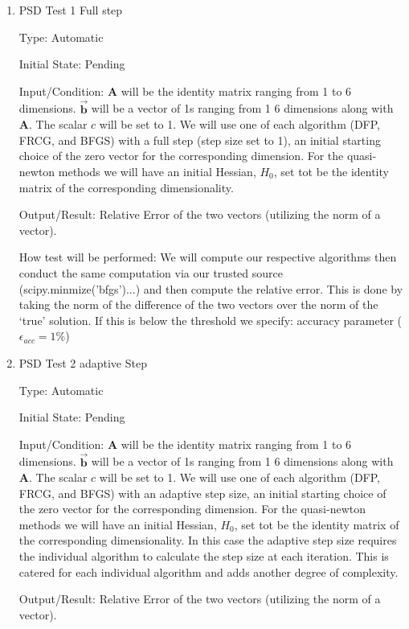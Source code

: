\documentclass[12pt, titlepage]{article}
\begin{document}
\begin{enumerate}

\item{PSD Test 1 Full step}\

Type: Automatic
					
Initial State: Pending
					
Input/Condition: $\mathbf{A}$ will be the identity matrix ranging from
1 to 6 dimensions. $\mathbf{\vec{b}}$ will be a vector of 1s ranging from 1 
6 dimensions along with $\mathbf{A}$. The scalar $c$ will be set to 1. We will
use one of each algorithm (DFP, FRCG, and BFGS) with a full step (step size set to 1),
an initial starting choice of the zero vector for the corresponding dimension. For the 
quasi-newton methods we will have an initial Hessian, $H_{0}$, set tot be the identity 
matrix of the corresponding dimensionality. 
					
Output/Result: Relative Error of the two vectors (utilizing the norm of a vector). 
					
How test will be performed: We will compute our respective algorithms then conduct the same 
computation via our trusted source (scipy.minmize('bfgs')...) and then compute the relative 
error. This is done by taking the norm of the difference of the two vectors over the norm of
the `true' solution. If this is below the threshold we specify: accuracy parameter ($\epsilon_{acc} = 1\%$) 


\item{PSD Test 2 adaptive Step}\

Type: Automatic
					
Initial State: Pending
					
Input/Condition: $\mathbf{A}$ will be the identity matrix ranging from
1 to 6 dimensions. $\mathbf{\vec{b}}$ will be a vector of 1s ranging from 1 
6 dimensions along with $\mathbf{A}$. The scalar $c$ will be set to 1. We will
use one of each algorithm (DFP, FRCG, and BFGS) with an adaptive step size,
an initial starting choice of the zero vector for the corresponding dimension. For the 
quasi-newton methods we will have an initial Hessian, $H_{0}$, set tot be the identity 
matrix of the corresponding dimensionality. In this case the adaptive step size requires 
the individual algorithm to calculate the step size at each iteration. This is catered for 
each individual algorithm and adds another degree of complexity.
					
Output/Result: Relative Error of the two vectors (utilizing the norm of a vector). 
					

\end{enumerate}
\end{document}
